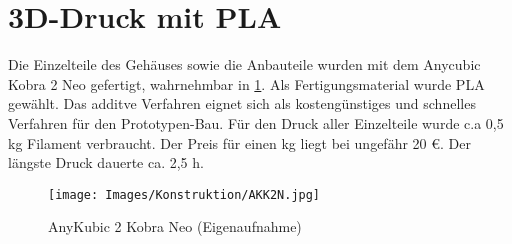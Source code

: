 \section{3D-Druck mit PLA}
Die Einzelteile des Gehäuses sowie die Anbauteile wurden mit dem Anycubic Kobra 2 Neo gefertigt, wahrnehmbar in \ref{AKK2N}. Als Fertigungsmaterial wurde PLA gewählt. Das additve Verfahren eignet sich als kostengünstiges und schnelles Verfahren für den Prototypen-Bau. Für den Druck aller Einzelteile wurde c.a 0,5 kg Filament verbraucht. Der Preis für einen kg liegt bei ungefähr 20 €. Der längste Druck dauerte ca. 2,5 h. 

	 \begin{figure}[H]
	 	\begin{center}
	 		\texttt{[image: Images/Konstruktion/AKK2N.jpg]}
	 		\caption{AnyKubic 2 Kobra Neo (Eigenaufnahme)} \label{AKK2N}
	 	\end{center}
	 \end{figure}  
